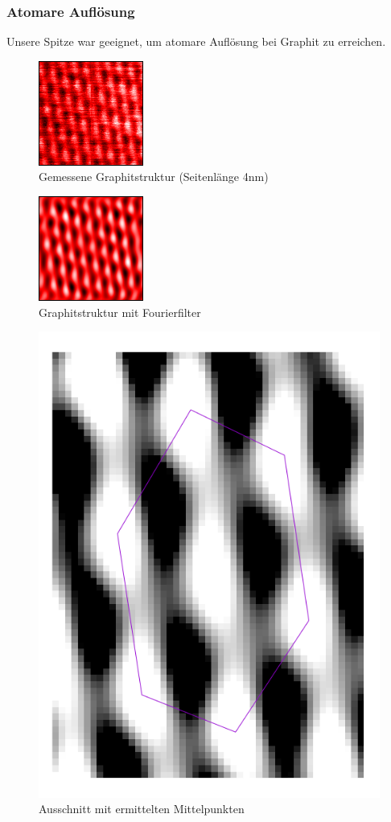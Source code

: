 \subsubsection{Atomare Auflösung}
Unsere Spitze war geeignet, um atomare Auflösung bei Graphit zu erreichen.
\begin{figure}
\centering
\includegraphics[scale=1]{data/graphit/raw.png}
\caption{Gemessene Graphitstruktur (Seitenlänge 4nm)}
\label{fig:raw}
\end{figure}
\begin{figure}
\centering
\includegraphics[scale=1]{data/graphit/2nm_edit2.png}
\caption{Graphitstruktur mit Fourierfilter}
\label{fig:edit}
\end{figure}
\begin{figure}
\centering
\includegraphics[scale=0.35]{data/graphit/graphit.png}
\caption{Ausschnitt mit ermittelten Mittelpunkten}
\label{fig:small}
\end{figure}
